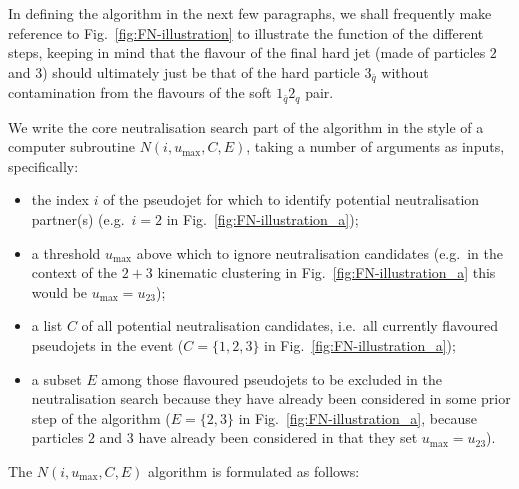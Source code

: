 \documentclass[nofootinbib,twocolumn,preprintnumbers,superscriptaddress,aps]{revtex4-2}
\begin{document}
In defining the algorithm in the next few paragraphs, we shall
frequently make reference to Fig.~\ref{fig:FN-illustration} to
illustrate the function of the different steps, keeping in mind that
the flavour of the final hard jet (made of particles $2$ and $3$)
should ultimately just be that of the hard particle $3_{\bar q}$
without contamination from the flavours of the soft $1_{\bar q}2_q$
pair.

We write the core neutralisation search part of the algorithm in
the style of a computer subroutine $N(i,u_{\max}, C, E)$, taking a
number of arguments as inputs, specifically:
%
\begin{itemize}
\item the index $i$ of the pseudojet for which to identify potential
  neutralisation partner(s) (e.g.\ $i=2$ in
  Fig.~\ref{fig:FN-illustration_a});
\item a threshold $u_{\max}$ above which to ignore neutralisation
  candidates (e.g.\ in the context of the $2+3$ kinematic clustering
  in Fig.~\ref{fig:FN-illustration_a} this would be $u_{\max}=u_{23}$);
\item a list $C$ of all potential neutralisation candidates, i.e.\ all
  currently flavoured pseudojets in the event ($C=\{1,2,3\}$ in
  Fig.~\ref{fig:FN-illustration_a});
\item a subset $E$ among those flavoured pseudojets to be excluded in
  the neutralisation search because they have already been considered
  in some prior step of the algorithm ($E = \{2,3\}$ in
  Fig.~\ref{fig:FN-illustration_a}, because particles $2$ and $3$ have
  already been considered in that they set $u_{\max}=u_{23}$).
\end{itemize}
%
The $N(i,u_{\max}, C, E)$ algorithm
is formulated as follows:
\end{document}
